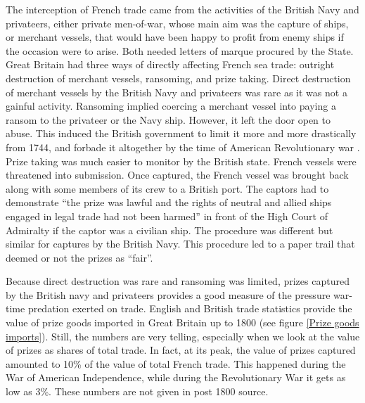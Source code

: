 \documentclass[12pt,a4paper,notitlepage,english]{article}
\begin{document}
The interception of French trade came from the activities of the British Navy and privateers, either private men-of-war, whose main aim was the capture of ships, or merchant vessels, that would have been happy to profit from enemy ships if the occasion were to arise.
Both needed letters of marque procured by the State.
Great Britain had three ways of directly affecting French sea trade: outright destruction of merchant vessels, ransoming, and prize taking.
Direct destruction of merchant vessels by the British Navy and privateers was rare as it was not a gainful activity.
Ransoming implied coercing a merchant vessel into paying a ransom to the privateer or the Navy ship.
However, it left the door open to abuse.
This induced the British government to limit it more and more drastically from 1744, and forbade it altogether by the time of American Revolutionary war \cite[see][p. 734]{Hillmann2011}.
Prize taking was much easier to monitor by the British state.
French vessels were threatened into submission.
Once captured, the French vessel was brought back along with some members of its crew to a British port.
The captors had to demonstrate ``the prize was lawful and the rights of neutral and allied ships engaged in legal trade had not been harmed'' \cite[see][p. 734]{Hillmann2011} in front of the High Court of Admiralty if the captor was a civilian ship.
The procedure was different but similar for captures by the British Navy.
This procedure led to a paper trail that deemed or not the prizes as ``fair''.

Because direct destruction was rare and ransoming was limited, prizes captured by the British navy and privateers provides a good measure of the pressure war-time predation exerted on trade.
English and British trade statistics provide the value of prize goods imported in Great Britain up to 1800 (see figure \ref{Prize goods imports}).
Still, the numbers are very telling, especially when we look at the value of prizes as shares of total trade.
In fact, at its peak, the value of prizes captured amounted to 10\% of the value of total French trade. 
This happened during the War of American Independence, while during the Revolutionary War it gets as low as 3\%.
These numbers are not given in post 1800 source.
\end{document}
